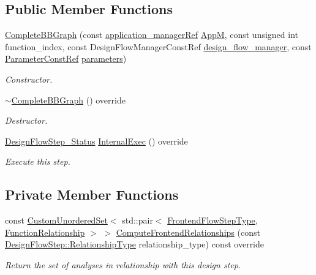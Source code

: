 \subsection*{Public Member Functions}
\begin{DoxyCompactItemize}
\item 
\hyperlink{classCompleteBBGraph_a0d49dbafe850acde991eedbe7aef7190}{Complete\+B\+B\+Graph} (const \hyperlink{application__manager_8hpp_a04ccad4e5ee401e8934306672082c180}{application\+\_\+manager\+Ref} \hyperlink{classFrontendFlowStep_a0ac0d8db2a378416583f51c4faa59d15}{AppM}, const unsigned int function\+\_\+index, const Design\+Flow\+Manager\+Const\+Ref \hyperlink{classDesignFlowStep_ab770677ddf087613add30024e16a5554}{design\+\_\+flow\+\_\+manager}, const \hyperlink{Parameter_8hpp_a37841774a6fcb479b597fdf8955eb4ea}{Parameter\+Const\+Ref} \hyperlink{classDesignFlowStep_a802eaafe8013df706370679d1a436949}{parameters})
\begin{DoxyCompactList}\small\item\em Constructor. \end{DoxyCompactList}\item 
\hyperlink{classCompleteBBGraph_af1653d457288fb3d2fe9ef019f0f633c}{$\sim$\+Complete\+B\+B\+Graph} () override
\begin{DoxyCompactList}\small\item\em Destructor. \end{DoxyCompactList}\item 
\hyperlink{design__flow__step_8hpp_afb1f0d73069c26076b8d31dbc8ebecdf}{Design\+Flow\+Step\+\_\+\+Status} \hyperlink{classCompleteBBGraph_a0c40c1a3925b328227433d1bb74458ed}{Internal\+Exec} () override
\begin{DoxyCompactList}\small\item\em Execute this step. \end{DoxyCompactList}\end{DoxyCompactItemize}
\subsection*{Private Member Functions}
\begin{DoxyCompactItemize}
\item 
const \hyperlink{classCustomUnorderedSet}{Custom\+Unordered\+Set}$<$ std\+::pair$<$ \hyperlink{frontend__flow__step_8hpp_afeb3716c693d2b2e4ed3e6d04c3b63bb}{Frontend\+Flow\+Step\+Type}, \hyperlink{classFrontendFlowStep_af7cf30f2023e5b99e637dc2058289ab0}{Function\+Relationship} $>$ $>$ \hyperlink{classCompleteBBGraph_a6c9c6ae98aaa799da86a86372a13e3e0}{Compute\+Frontend\+Relationships} (const \hyperlink{classDesignFlowStep_a723a3baf19ff2ceb77bc13e099d0b1b7}{Design\+Flow\+Step\+::\+Relationship\+Type} relationship\+\_\+type) const override
\begin{DoxyCompactList}\small\item\em Return the set of analyses in relationship with this design step. \end{DoxyCompactList}\end{DoxyCompactItemize}
